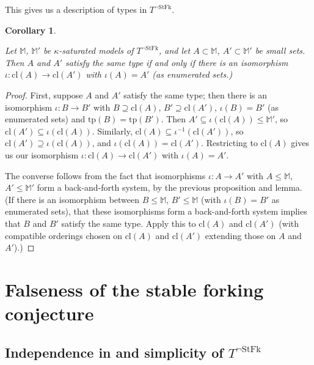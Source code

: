 \documentclass{amsart}
\newtheorem{cor}[theorem]{Corollary}
\theoremstyle{definition}
\theoremstyle{remark}
\numberwithin{equation}{section}
\begin{document}
This gives us a description of types in $T^{\neg \mathrm{StFk}}$.

\begin{cor}\label{quantifier elimination}

Let $\mathbb{M}$, $\mathbb{M}'$ be $\kappa$-saturated models of $T^{\neg \mathrm{StFk}}$, and let $A \subset \mathbb{M}$, $A' \subset \mathbb{M}'$ be small sets. Then $A$ and $A'$ satisfy the same type if and only if there is an isomorphism $\iota: \mathrm{cl}(A) \to \mathrm{cl}(A')$ with $\iota(A) = A'$ (as enumerated sets.)

\end{cor}

\begin{proof}
    First, suppose $A$ and $A'$ satisfy the same type; then there is an isomorphism $\iota: B \to B'$ with $B \supseteq \mathrm{cl}(A)$, $B' \supseteq \mathrm{cl}(A')$,  $\iota(B) = B'$ (as enumerated sets) and $\mathrm{tp}(B)=\mathrm{tp}(B')$. Then $A' \subseteq \iota(\mathrm{cl}(A)) \leq \mathbb{M}'$, so $\mathrm{cl}(A') \subseteq \iota(\mathrm{cl}(A))$. Similarly, $\mathrm{cl}(A) \subseteq \iota^{-1}(\mathrm{cl}(A'))$, so $\mathrm{cl}(A') \supseteq \iota(\mathrm{cl}(A))$, and $\iota(\mathrm{cl}(A))=\mathrm{cl}(A')$. Restricting to $\mathrm{cl}(A)$ gives us our isomorphism $\iota: \mathrm{cl}(A) \to \mathrm{cl}(A')$ with $\iota(A) = A'$.

    The converse follows from the fact that isomorphisms $\iota: A \to A'$ with $A \leq \mathbb{M}$, $A' \leq \mathbb{M}'$ form a back-and-forth system, by the previous proposition and lemma. (If there is an isomorphism between $B \leq \mathbb{M}$, $B' \leq \mathbb{M}$ (with $\iota(B) = B'$ as enumerated sets), that these isomorphisms form a back-and-forth system implies that $B$ and $B'$ satisfy the same type. Apply this to $\mathrm{cl}(A)$ and $\mathrm{cl}(A')$ (with compatible orderings chosen on $\mathrm{cl}(A)$ and $\mathrm{cl}(A')$ extending those on $A$ and $A'$).)
\end{proof}

\section{Falseness of the stable forking conjecture}\label{counterexample verification}

\subsection{Independence in and simplicity of $T^{\neg\mathrm{StFk}}$}\label{simplicity of the example}
\end{document}
